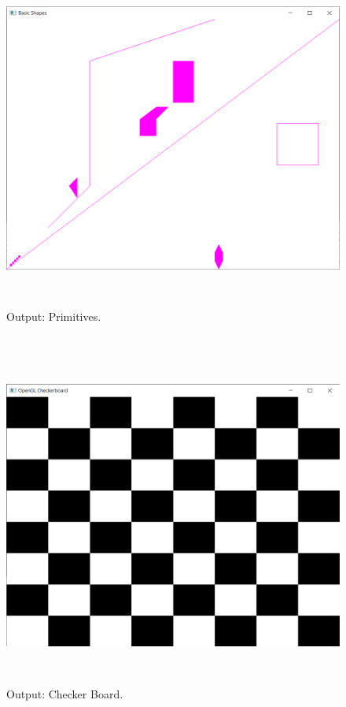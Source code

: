 \documentclass[12pt, a4]{article}
\begin{document}
\newpage
\subsection*{}
\begin{figure}[h]
\centering
\caption{Output: Primitives.}
\includegraphics[height=11.25cm, width=15cm]{Primitives/Output.png}
\end{figure}

\newpage
\subsection*{}
\begin{figure}[h]
\centering
\caption{Output: Checker Board.}
\includegraphics[height=11.25cm, width=15cm]{Checkerboard/Output.png}
\end{figure}
\end{document}
